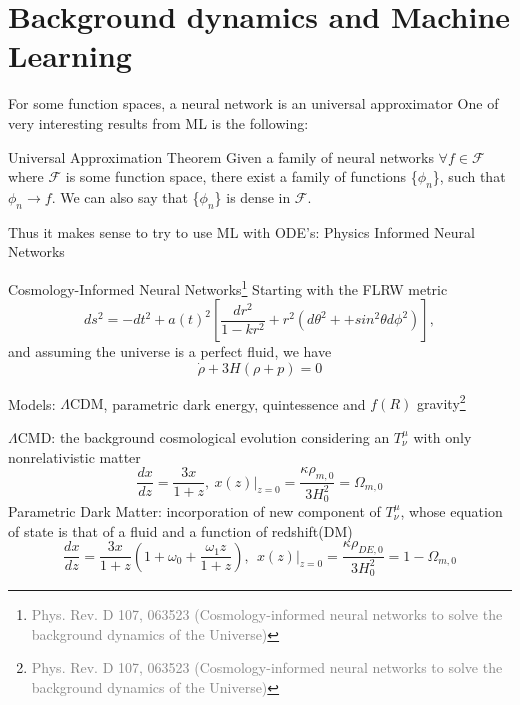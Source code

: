 \documentclass[aspectratio=169, 12pt]{beamer}
\newcommand{\gray}[1]{\textcolor{gray}{#1}}
\begin{document}
\section{Background dynamics and Machine Learning}
\begin{frame}{For some function spaces, a neural network is an universal approximator}
One of very interesting results from ML is the following:\pause
\begin{block}{\alert{Universal Approximation Theorem}}
Given a family of neural networks $\forall f\in \mathcal{F}$ where $\mathcal{F}$ is some function space, there exist a family of functions \{$\phi_n$\}, such that $\phi_n\rightarrow f$. We can also say that \{$\phi_n$\} is dense in $\mathcal{F}$.\pause
\end{block}
\alert{Thus it makes sense to try to use ML with ODE's: Physics Informed Neural Networks}
\end{frame}
\begin{frame}{Cosmology-Informed Neural Networks\footnote{\tiny{\gray{Phys. Rev. D 107, 063523 (Cosmology-informed neural networks to solve the background dynamics of the Universe)}}}}
Starting with the FLRW metric
\begin{displaymath}
ds^2  = -dt^2 +a(t)^2\left[ \frac{dr^2}{1-kr^2} + r^2(d\theta^2+ +sin^2\theta d\phi^2)\right],
\end{displaymath}
and assuming the universe is a perfect fluid, we have
\begin{displaymath}
\dot{\rho} + 3H(\rho + p) = 0
\end{displaymath}
\end{frame}
\begin{frame}{Models: \alert{$\Lambda$CDM}, \alert{parametric dark energy}, \alert{quintessence}  and \alert{$f(R)$ gravity}\footnote{\tiny{\gray{Phys. Rev. D 107, 063523 (Cosmology-informed neural networks to solve the background dynamics of the Universe)}}}}

\alert{$\Lambda$CMD:} the background cosmological evolution considering an $T^{\mu}_{\nu}$ with only nonrelativistic matter\pause
\begin{displaymath}
  \frac{dx}{dz} = \frac{3x}{1+z}, \ x(z)|_{z=0} = \frac{\kappa\rho_{m,0}}{3H_0^2}=\Omega_{m,0}
\end{displaymath}
\pause
\alert{Parametric Dark Matter:} incorporation of new component of $T^{\mu}_{\nu}$, whose equation of state is that of a fluid and a function of redshift(\alert{DM})\pause
	\begin{displaymath}
  	\frac{dx}{dz} = \frac{3x}{1+z}\left( 1+\omega_0 + \frac{\omega_1 z}{1+z}\right), \ \ x(z)|_{z=0} = \frac{\kappa\rho_{DE,0}}{3H_0^2} = 1-\Omega_{m,0}
	\end{displaymath}

\end{frame}
\end{document}
